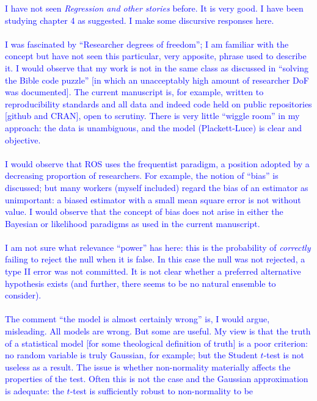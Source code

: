 \documentclass[12pt]{article}
\begin{document}
\textcolor{blue}{I have not seen {\em Regression and other stories}
  before.  It is very good.  I have been studying chapter 4 as
  suggested.  I make some discursive responses here.\\ \\ I was
  fascinated by ``Researcher degrees of freedom''; I am familiar with
  the concept but have not seen this particular, very apposite, phrase
  used to describe it.  I would observe that my work is not in the
  same class as discussed in ``solving the Bible code puzzle'' [in
    which an unacceptably high amount of researcher DoF was
    documented].  The current manuscript is, for example, written to
  reproducibility standards and all data and indeed code held on
  public repositories [github and CRAN], open to scrutiny.  There is
  very little ``wiggle room'' in my approach: the data is unambiguous,
  and the model (Plackett-Luce) is clear and objective.\\ \\ I would
  observe that ROS uses the frequentist paradigm, a
  position adopted by a decreasing proportion of researchers.  For
  example, the notion of ``bias'' is discussed; but many workers
  (myself included) regard the bias of an estimator as unimportant: a
  biased estimator with a small mean square error is not without
  value.  I would observe that the concept of bias does not arise in
  either the Bayesian or likelihood paradigms as used in the current
  manuscript.\\ \\I am not sure what relevance ``power'' has here:
  this is the probability of {\em correctly} failing to reject the
  null when it is false.  In this case the null was not rejected, a
  type II error was not committed.  It is not clear whether a
  preferred alternative hypothesis exists (and further, there seems to
  be no natural ensemble to consider).\\ \\ The comment ``the model is
  almost certainly wrong'' is, I would argue, misleading.  All models
  are wrong.  But some are useful.  My view is that the truth of a
  statistical model [for some theological definition of truth] is a
  poor criterion: no random variable is truly Gaussian, for example;
  but the Student $t$-test is not useless as a result.  The issue is
  whether non-normality materially affects the properties of the test.
  Often this is not the case and the Gaussian approximation is
  adequate: the $t$-test is sufficiently robust to non-normality to be
}
\end{document}
